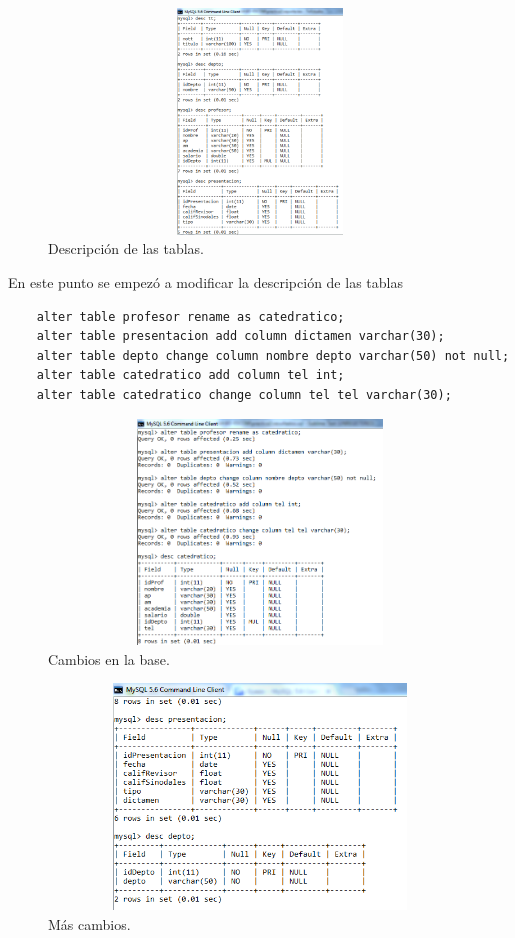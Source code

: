 \documentclass[12pt, titlepage]{article}
\begin{document}
    \begin{figure}[H]
        \begin{center}
            \includegraphics[width=12cm, height=6cm]{img/tablas.png}
            \caption{Descripción de las tablas.}
            \label{fig:tablas}
        \end{center}
    \end{figure}
    En este punto se empezó a modificar la descripción de las tablas
    \begin{lstlisting}
    alter table profesor rename as catedratico;
    alter table presentacion add column dictamen varchar(30);
    alter table depto change column nombre depto varchar(50) not null;
    alter table catedratico add column tel int;
    alter table catedratico change column tel tel varchar(30);
    \end{lstlisting}
    \begin{figure}[H]
        \begin{center}
            \includegraphics[width=12cm, height=6cm]{img/cambios.png}
            \caption{Cambios en la base.}
            \label{fig:cambios}
        \end{center}
    \end{figure}
\begin{figure}[H]
    \begin{center}
        \includegraphics[width=12cm, height=6cm]{img/mascambios.png}
        \caption{Más cambios.}
        \label{fig:cambios2}
    \end{center}
\end{figure}
\end{document}
